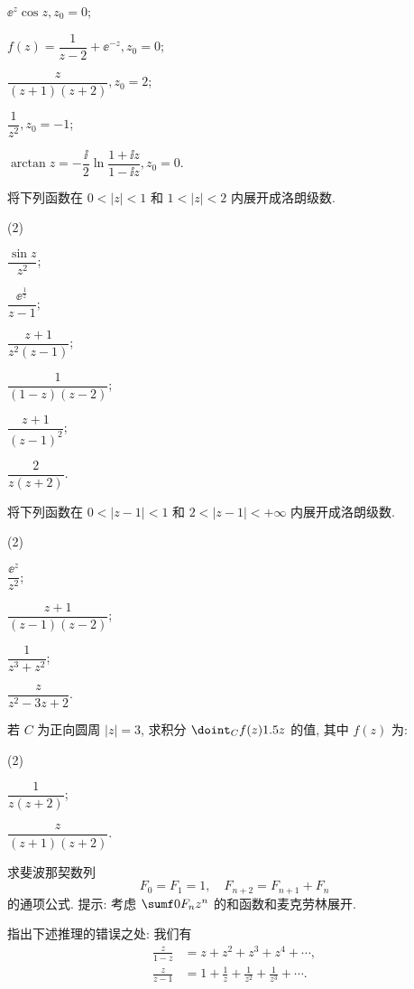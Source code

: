 \begin{homework}
\begin{subex}
\begin{subsubex}
      \item $\ee^z\cos z, z_0=0$;
      \item $f(z)=\dfrac{1}{z-2}+\ee^{-z}, z_0=0$;
      \item $\dfrac{z}{(z+1)(z+2)}, z_0=2$;
      \item $\dfrac1{z^2}, z_0=-1$;
      \item $\arctan z=-\dfrac\ii2\ln\dfrac{1+\ii z}{1-\ii z}, z_0=0$.
    \end{subsubex}
    \item 将下列函数在 $0<|z|<1$ 和 $1<|z|<2$ 内展开成洛朗级数.
      \begin{subsubex}(2)
        \item $\dfrac{\sin z}{z^2}$;
        \item $\dfrac{\ee^{\frac1z}}{z-1}$;
        \item $\dfrac{z+1}{z^2(z-1)}$;
        \item $\dfrac1{(1-z)(z-2)}$;
        \item $\dfrac{z+1}{(z-1)^2}$;
        \item $\dfrac{2}{z(z+2)}$.
      \end{subsubex}
    \item 将下列函数在 $0<|z-1|<1$ 和 $2<|z-1|<+\infty$ 内展开成洛朗级数.
      \begin{subsubex}(2)
        \item $\dfrac{\ee^z}{z^2}$;
        \item $\dfrac{z+1}{(z-1)(z-2)}$;
        \item $\dfrac{1}{z^3+z^2}$;
        \item $\dfrac{z}{z^2-3z+2}$.
      \end{subsubex}
    \item 若 $C$ 为正向圆周 $|z|=3$, 求积分 $\doint_Cf(z)\d z$ 的值, 其中 $f(z)$ 为:
      \begin{subsubex}(2)
        \item $\dfrac1{z(z+2)}$;
        \item $\dfrac{z}{(z+1)(z+2)}$.
      \end{subsubex}
    \item 求斐波那契数列
      \[
        F_0=F_1=1,\quad F_{n+2}=F_{n+1}+F_n
      \]
      的通项公式.
      提示: 考虑 $\sumf0 F_n z^n$ 的和函数和麦克劳林展开.
    \item 指出下述推理的错误之处: 我们有
      \begin{align*}
        \frac{z}{1-z}&=z+z^2+z^3+z^4+\cdots,\\
        \frac{z}{z-1}&=1+\frac1z+\frac1{z^2}+\frac1{z^3}+\cdots.

\end{align*}
\end{subex}
\end{homework}
